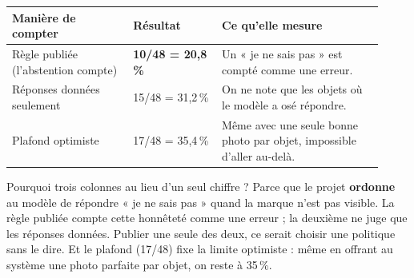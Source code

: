 \documentclass[10pt,a4paper]{article}
\begin{document}
\begin{center}
\begin{minipage}[t]{0.47\linewidth}
\footnotesize\sffamily
\begin{tabular}{@{}p{0.30\linewidth}p{0.22\linewidth}p{0.40\linewidth}@{}}
\toprule
\textbf{Manière de compter} & \textbf{Résultat} & \textbf{Ce qu'elle mesure}\\
\midrule
Règle publiée (l'abstention compte) & \textbf{10/48 = 20,8\,\%} & Un « je ne sais pas » est compté comme une erreur.\\
Réponses données seulement & 15/48 = 31,2\,\% & On ne note que les objets où le modèle a osé répondre.\\
Plafond optimiste & 17/48 = 35,4\,\% & Même avec une seule bonne photo par objet, impossible d'aller au-delà.\\
\bottomrule
\end{tabular}
\end{minipage}\hfill
\begin{minipage}[t]{0.49\linewidth}
\end{minipage}
\end{center}

\begin{clair}
Pourquoi trois colonnes au lieu d'un seul chiffre ? Parce que le projet \textbf{ordonne} au modèle
de répondre « je ne sais pas » quand la marque n'est pas visible. La règle publiée compte cette
honnêteté comme une erreur ; la deuxième ne juge que les réponses données. Publier une seule des
deux, ce serait choisir une politique sans le dire. Et le plafond (17/48) fixe la limite
optimiste : même en offrant au système une photo parfaite par objet, on reste à 35\,\%.
\end{clair}
\end{document}
